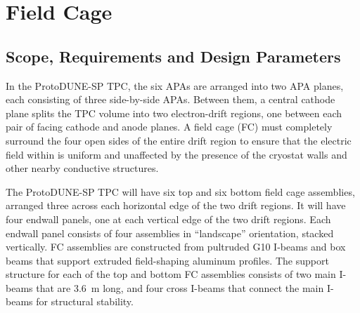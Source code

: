 



\section{Field Cage}

\subsection{Scope, Requirements and Design Parameters}

In the ProtoDUNE-SP TPC, 
the six APAs are arranged into two APA planes, each consisting of three side-by-side APAs. Between them,  
a central cathode plane splits the TPC volume into two
electron-drift regions, one between
each pair of facing cathode and anode planes. %
A field cage (FC) must completely surround the four
open sides of the entire drift %
region %
to ensure that the %
 electric field within is uniform and unaffected by the presence
of the cryostat walls and other nearby conductive structures.


The ProtoDUNE-SP TPC will have six top and six bottom field cage assemblies, arranged three across each horizontal edge of the two drift regions. It will have 
four endwall panels, one at each vertical edge of the two drift regions.
Each endwall panel consists of four assemblies in ``landscape'' orientation, stacked vertically.
FC assemblies are constructed from pultruded G10 I-beams and box beams that support extruded field-shaping aluminum profiles. The support structure for each of the top and bottom FC assemblies consists of two main I-beams that are 3.6~m long, and four cross I-beams  that connect the main I-beams for structural stability.


